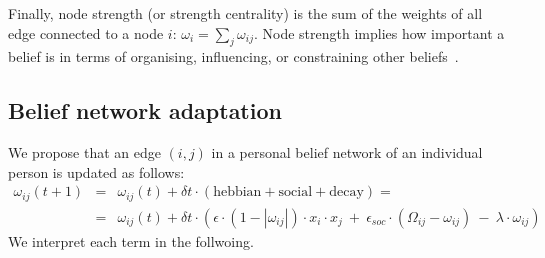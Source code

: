 \documentclass[10pt]{article}
\begin{document}
Finally, node strength (or strength centrality) is the sum of the weights of all edge connected to a node $i$: $\omega_{i} = \sum_j \omega_{ij}$. Node strength implies how important a belief is in terms of organising, influencing, or constraining other beliefs~\cite{fishmanChangeWeCan2022}. 

\subsection{Belief network adaptation}

We propose that an edge $(i,j)$ in a personal belief network of an individual person is updated as follows:
\begin{eqnarray}
    \omega_{ij}(t+1) & = & \omega_{ij}(t) + \delta t \cdot \left(\text{hebbian} + \text{social} + \text{decay} \right) = \nonumber \\
     & = & \omega_{ij}(t) + \delta t \cdot \left( \epsilon \cdot (1- |\omega_{ij}|) \cdot  x_{i} \cdot x_{j} \ +\  \epsilon_{soc} \cdot (\Omega_{ij} - \omega_{ij}) \ -\  \lambda \cdot \omega_{ij} \right) 
\end{eqnarray}
We interpret each term in the follwoing.
\end{document}
